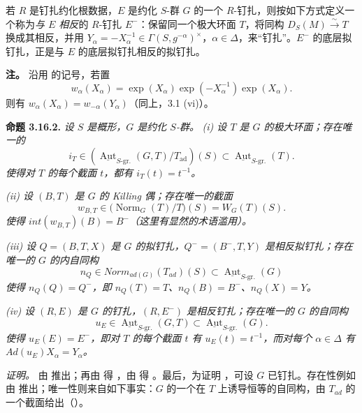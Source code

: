 若 \(R\) 是钉扎约化根数据，\(E\) 是约化 \(S\)-群 \(G\) 的一个 \(R\)-钉扎，则按如下方式定义一个称为\emph{与 \(E\) 相反}的 \(R\)-钉扎 \(E^{-}\)：保留同一个极大环面 \(T\)，将同构 \(D_{S}(M) \xrightarrow{\sim} T\) 换成其相反，并用 \(Y_{\alpha} = -X^{-1}_{\alpha} \in\Gamma(S, g^{-\alpha})^{\times}\)，\(\alpha \in \Delta\)，来“钉扎”。\(E^{-}\) 的底层拟钉扎，正是与 \(E\) 的底层拟钉扎相反的拟钉扎。

\textbf{注。} 沿用 的记号，若置
\[
  w_\alpha(X_\alpha)
  =\exp(X_\alpha)\exp(-X_\alpha^{-1})\exp(X_\alpha).
\]
则有 \(w_{\alpha}(X_{\alpha}) = w_{-\alpha}(Y_{\alpha})\)（同上，3.1 (vi)）。

\textbf{命题 3.16.2.} \emph{设 \(S\) 是概形，\(G\) 是约化 \(S\)-群。}
\emph{(i) 设 \(T\) 是 \(G\) 的极大环面；存在唯一的}
\[
  i_T\in
  \left(
    \underline{\operatorname{Aut}}_{S\text{-}\mathrm{gr.}}(G,T)/T_{\mathrm{ad}}
  \right)(S)
  \subset
  \underline{\operatorname{Aut}}_{S\text{-}\mathrm{gr.}}(T).
\]
\emph{使得对 \(T\) 的每个截面 \(t\)，都有 \(i_{T}(t) = t^{-1}\)。}

\emph{(ii) 设 \((B, T)\) 是 \(G\) 的 Killing 偶；存在唯一的截面}
\[
  w_{B,T}\in
  \bigl(\operatorname{Norm}_G(T)/T\bigr)(S)=W_G(T)(S).
\]
\emph{使得 \(int(w_{B, T})(B) = B^{-}\)（这里有显然的术语滥用）。}

\emph{(iii) 设 \(Q = (B, T, X)\) 是 \(G\) 的拟钉扎，\(Q^{-} = (B^{-}, T, Y)\) 是相反拟钉扎；存在唯一的 \(G\) 的内自同构}
\[ n_{Q} \in Norm_{ad(G)}(T_{ad})(S) \subset \underline{\operatorname{Aut}}_{S\text{-}\mathrm{gr.}}(G) \]
\emph{使得 \(n_{Q}(Q) = Q^{-}\)，即 \(n_{Q}(T) = T\)、\(n_{Q}(B) = B^{-}\)、\(n_{Q}(X) = Y\)。}

\emph{(iv) 设 \((R, E)\) 是 \(G\) 的钉扎，\((R, E^{-})\) 是相反钉扎；存在唯一的 \(G\) 的自同构}
\[
  u_E\in
  \underline{\operatorname{Aut}}_{S\text{-}\mathrm{gr.}}(G,T)
  \subset
  \underline{\operatorname{Aut}}_{S\text{-}\mathrm{gr.}}(G).
\]
\emph{使得 \(u_{E}(E) = E^{-}\)，即对 \(T\) 的每个截面 \(t\) 有 \(u_{E}(t) = t^{-1}\)，而对每个 \(\alpha \in \Delta\) 有 \(Ad(u_{E}) X_{\alpha} =Y_{\alpha}\)。}

\emph{证明。}  由 推出；再由  得 ，由 得 。最后，为证明 ，可设 \(G\) 已钉扎。存在性例如由  推出；唯一性则来自如下事实：\(G\) 的一个在 \(T\) 上诱导恒等的自同构，由 \(T_{ad}\) 的一个截面给出（）。

